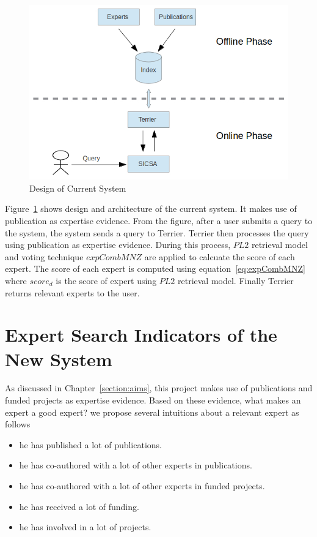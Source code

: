  \begin{figure}
 \centering
 \includegraphics[scale=0.5,keepaspectratio]{./figures/currentSystemDesign.jpg}
 \caption{Design of Current System} \label{fig:currentDesign} 
\end{figure}
Figure~\ref{fig:currentDesign} shows design and architecture of the current system. It makes use of publication as expertise evidence. 
From the figure, after a user submits a query to the system, the system sends a query to Terrier. Terrier then processes the query using publication
as expertise evidence. During this process, $PL2$ retrieval model and voting technique $expCombMNZ$ are applied to calcuate the score of each expert.
The score of each expert is computed using equation~\ref{eq:expCombMNZ} where $score_d$ is the score of expert using $PL2$ retrieval model.
Finally Terrier returns relevant experts to the user.

\section{Expert Search Indicators of the New System}\label{section:goodexpert}
As discussed in Chapter~\ref{section:aims}, this project makes use of publications and funded projects as 
expertise evidence. Based on these evidence, what makes an expert a good expert? we propose several intuitions about a relevant expert as follows 
\begin{itemize}
 \item he has published a lot of publications.
 \item he has co-authored with a lot of other experts in publications.
 \item he has co-authored with a lot of other experts in funded projects.
 \item he has received a lot of funding.
 \item he has involved in a lot of projects.
\end{itemize}

